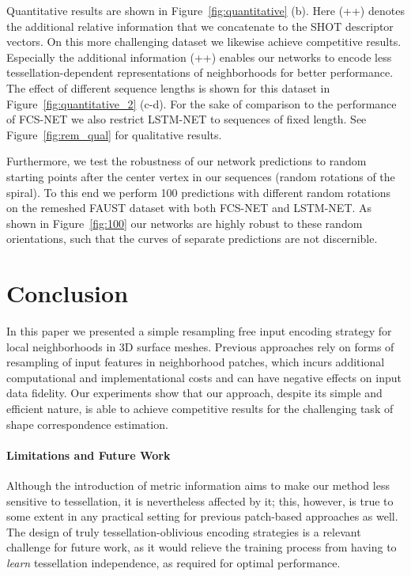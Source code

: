 \documentclass[runningheads]{llncs}
\begin{document}
Quantitative results are shown in Figure~\ref{fig:quantitative} (b). Here (++) denotes the additional relative information that we concatenate to the SHOT descriptor vectors. On this more challenging dataset we likewise achieve competitive results.
Especially the additional information (++) enables our networks to encode less tessellation-dependent representations of neighborhoods for better performance.
The effect of different sequence lengths is shown for this dataset in Figure~\ref{fig:quantitative_2} (c-d). For the sake of comparison to the performance of FCS-NET we also restrict LSTM-NET to sequences of fixed length.
See Figure~\ref{fig:rem_qual} for qualitative results.

Furthermore, we test the robustness of our network predictions to random starting points after the center vertex in our sequences (random rotations of the spiral). To this end we perform 100 predictions with different random rotations on the remeshed FAUST dataset with both FCS-NET and LSTM-NET. As shown in Figure~\ref{fig:100} our networks are highly robust to these random orientations, such that the curves of separate predictions are not discernible.


\section{Conclusion}
In this paper we presented a simple resampling free input encoding strategy for local neighborhoods in 3D surface meshes. Previous approaches rely on forms of resampling of input features in neighborhood patches, which incurs additional computational and implementational costs and can have negative effects on input data fidelity.
Our experiments show that our approach, despite its simple and efficient nature, is able to achieve competitive results for the challenging task of shape correspondence estimation.
\paragraph{\textbf{Limitations and Future Work}}
Although the introduction of metric information aims to make our method less sensitive to tessellation, it is nevertheless affected by it; this, however, is true to some extent in any practical setting for previous patch-based approaches as well. The design of truly tessellation-oblivious encoding strategies is a relevant challenge for future work, as it would relieve the training process from having to \emph{learn} tessellation independence, as required for optimal performance.
\end{document}
